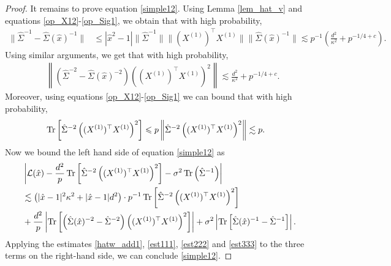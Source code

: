 \begin{proof}
It remains to prove equation \eqref{simple12}. Using Lemma \ref{lem_hat_v} and equations \eqref{op_X12}-\eqref{op_Sig1}, we obtain that with high probability,
\begin{align}
 \|\hat\Sigma^{-1}-\hat\Sigma(\hat x)^{-1}\| &\le |\hat x^2-1|\|\hat\Sigma^{-1}\| \| (X^{(1)})^\top X^{(1)}\|\|\hat\Sigma(\hat x)^{-1}\|  \lesssim p^{-1}\left(\frac{d^2}{\kappa^2} + p^{-1/4+c}\right).\label{est111}
\end{align}
Using similar arguments, we get that with high probability,
\begin{align}\label{est222}
&\left\|\left(\hat\Sigma^{-2}-\hat\Sigma(\hat x)^{-2}\right)\left((X^{(1)})^\top X^{(1)} \right)^2\right\| \lesssim  \frac{d^2}{\kappa^2} + p^{-1/4+c} .
\end{align}
Moreover, using equations \eqref{op_X12}-\eqref{op_Sig1} we can bound that with high probability,
\begin{align}
& \operatorname{Tr}\left[ \hat\Sigma^{-2} \left((X^{(1)})^{\top}X^{(1)}\right)^2\right]  \leqslant p \left\| \hat\Sigma^{-2} \left((X^{(1)})^{\top}X^{(1)}\right)^2 \right\|\lesssim p.\label{est333}
\end{align}
Now we bound the left hand side of equation \eqref{simple12} as
\begin{align*}
&\left|\mathcal L(\hat x)-\frac{d^2}{p}\operatorname{Tr}\left[\hat\Sigma^{-2} \left((X^{(1)})^\top X^{(1)} \right)^2\right] -\sigma^2  \operatorname{Tr}\left({\hat\Sigma^{-1}  }\right)\right| \\
&\lesssim \left(|\hat x-1|^2 \kappa^2 + |\hat x-1|d^2\right)\cdot p^{-1}\operatorname{Tr}\left[ \hat\Sigma^{-2} \left((X^{(1)})^{\top}X^{(1)}\right)^2 \right] \\
&+ \frac{d^2}{p}\left|\operatorname{Tr}\left[\left(\hat\Sigma(\hat x)^{-2}-\hat\Sigma^{-2}\right) \left((X^{(1)})^\top X^{(1)} \right)^2\right]\right|+ \sigma^2  \left|\operatorname{Tr}\left[\hat\Sigma(\hat x)^{-1}-\hat\Sigma^{-1}  \right]\right|.
\end{align*}
Applying the estimates \eqref{hatw_add1}, \eqref{est111}, \eqref{est222} and \eqref{est333} to the three terms on the right-hand side, we can conclude \eqref{simple12}.


\end{proof}
